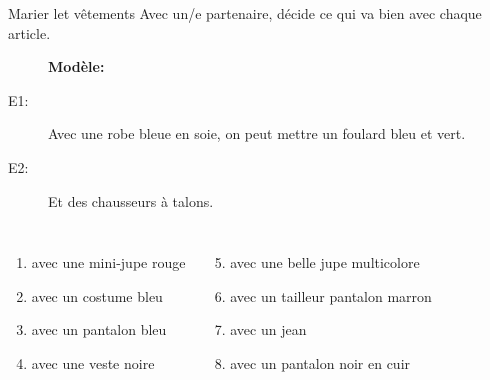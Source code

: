 \begin{frame}{Marier let vêtements}
  Avec un/e partenaire, décide ce qui va bien avec chaque article. \\
  \begin{description}
    \item[] \textbf{Modèle:} 
    \item[E1:] Avec une robe bleue en soie, on peut mettre un foulard bleu et vert.
    \item[] 
    \item[E2:] Et des chausseurs à talons.
    \item[] 
  \end{description}
  \begin{columns}
      \begin{enumerate}
        \item avec une mini-jupe rouge
        \item avec un costume bleu
        \item avec un pantalon bleu
        \item avec une veste noire
      \end{enumerate}
      \begin{enumerate}
        \setcounter{enumi}{4}
        \item avec une belle jupe multicolore
        \item avec un tailleur pantalon marron
        \item avec un jean
        \item avec un pantalon noir en cuir
      \end{enumerate}
  \end{columns}
\end{frame}